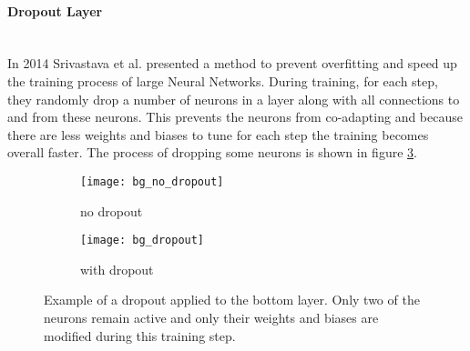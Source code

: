 \paragraph{Dropout Layer} ~\\
In 2014 Srivastava et al.\cite{Srivastava2014} presented a method to prevent overfitting and speed up the training process of large Neural Networks. During training, for each step, they randomly drop a number of neurons in a layer along with all connections to and from these neurons. This prevents the neurons from co-adapting \cite{Srivastava2014} and because there are less weights and biases to tune for each step the training becomes overall faster. The process of dropping some neurons is shown in figure \ref{fig:bg:dropout}.

\begin{figure}[H]
\centering
\begin{subfigure}{.5\textwidth}
    \centering
    \texttt{[image: bg\_no\_dropout]}
    \caption{no dropout}
    \label{}
\end{subfigure}%
\begin{subfigure}{.5\textwidth}
    \centering
    \texttt{[image: bg\_dropout]}
    \caption{with dropout}
    \label{}
\end{subfigure}
\caption{Example of a dropout applied to the bottom layer. Only two of the neurons remain active and only their weights and biases are modified during this training step. \cite{Srivastava2014}}
\label{fig:bg:dropout}
\end{figure}
